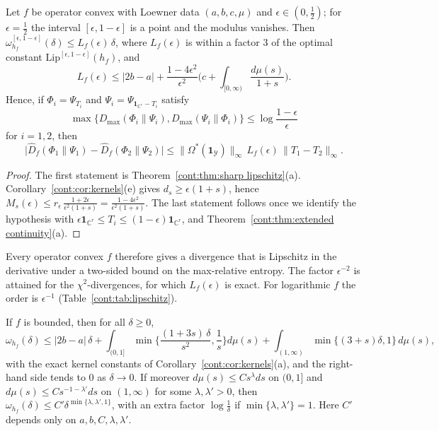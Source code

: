  
\begin{corollary}\label{cont:cor:thompson lipschitz}
Let $f$ be operator convex with Loewner data $(a,b,c,\mu)$ and $\epsilon\in(0,\frac12)$; for $\epsilon=\frac12$ the interval $[\epsilon,1-\epsilon]$ is a point and the modulus vanishes. Then $\omega^{[\epsilon,1-\epsilon]}_{h_f}(\delta)\leq L_f(\epsilon)\,\delta$, where $L_f(\epsilon)$ is within a factor $3$ of the optimal constant $\mathrm{Lip}^{[\epsilon,1-\epsilon]}(h_f)$, and
\[
L_f(\epsilon)\leq|2b-a|+\frac{1-4\epsilon^2}{\epsilon^2}\Big(c+\int_{[0,\infty)}\frac{d\mu(s)}{1+s}\Big).
\]
Hence, if $\Phi_i=\Psi_{T_i}$ and $\Psi_i=\Psi_{\mathbf{1}_{\mathbb{C}^r}-T_i}$ satisfy
\[
\max\{D_{\max}(\Phi_i\|\Psi_i),D_{\max}(\Psi_i\|\Phi_i)\}\leq\log\frac{1-\epsilon}{\epsilon}
\]
for $i=1,2$, then
\[
\big|\widehat{D}_f(\Phi_1\|\Psi_1)-\widehat{D}_f(\Phi_2\|\Psi_2)\big|\leq\|\Omega^*(\mathbf{1}_{\mathcal{Y}})\|_\infty\,L_f(\epsilon)\,\|T_1-T_2\|_\infty .
\]
\end{corollary}
 
\begin{proof}
The first statement is Theorem~\ref{cont:thm:sharp lipschitz}(a). Corollary~\ref{cont:cor:kernels}(e) gives $d_s\geq\epsilon(1+s)$, hence $M_s(\epsilon)\leq r_\epsilon\,\frac{1+2\epsilon}{\epsilon^2(1+s)}=\frac{1-4\epsilon^2}{\epsilon^2(1+s)}$. The last statement follows once we identify the hypothesis with $\epsilon\mathbf{1}_{\mathbb{C}^r}\leq T_i\leq(1-\epsilon)\mathbf{1}_{\mathbb{C}^r}$, and Theorem~\ref{cont:thm:extended continuity}(a).
\end{proof}
 
Every operator convex $f$ therefore gives a divergence that is Lipschitz in the derivative under a two-sided bound on the max-relative entropy. The factor $\epsilon^{-2}$ is attained for the $\chi^2$-divergences, for which $L_f(\epsilon)$ is exact. For logarithmic $f$ the order is $\epsilon^{-1}$ (Table~\ref{cont:tab:lipschitz}).
 
\begin{corollary}\label{cont:cor:rates}
If $f$ is bounded, then for all $\delta\geq0$,
\[
\omega_{h_f}(\delta)\leq|2b-a|\,\delta+\int_{(0,1]}\min\Big\{\frac{(1+3s)\,\delta}{s^2},\frac1s\Big\}d\mu(s)+\int_{(1,\infty)}\min\{(3+s)\delta,1\}\,d\mu(s),
\]
with the exact kernel constants of Corollary~\ref{cont:cor:kernels}(a), and the right-hand side tends to $0$ as $\delta\to0$. If moreover $d\mu(s)\leq Cs^{\lambda}ds$ on $(0,1]$ and $d\mu(s)\leq Cs^{-1-\lambda'}ds$ on $(1,\infty)$ for some $\lambda,\lambda'>0$, then $\omega_{h_f}(\delta)\leq C'\delta^{\min\{\lambda,\lambda',1\}}$, with an extra factor $\log\frac1\delta$ if $\min\{\lambda,\lambda'\}=1$. Here $C'$ depends only on $a,b,C,\lambda,\lambda'$.
\end{corollary}
 
